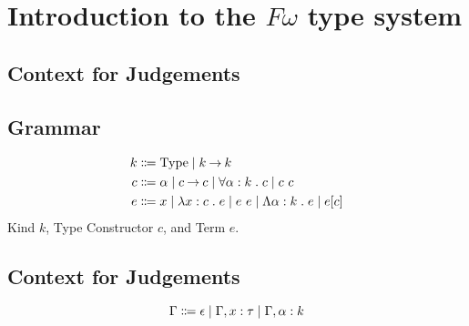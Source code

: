 \newpage
\section{Introduction to the $F\omega$ type system}


\begin{grouped}{\subsection{Context for Judgements}}
\subsection{Grammar}
\begin{align*}
k & \mathrel{\Coloneqq} \operatorname{Type} \mathrel{\mid} k \mathbin{\rightarrow} k \\
c & \mathrel{\Coloneqq} \alpha \mathrel{\mid} c \mathbin{\rightarrow} c \mathrel{\mid} \forall \alpha \mathrel{:} k\mathrel{.} c \mathrel{\mid} c\ c \\
e & \mathrel{\Coloneqq} x \mathrel{\mid} \lambda x \mathrel{:} c\mathrel{.} e \mathrel{\mid} e\ e
    \mathrel{\mid} \Lambda \alpha \mathrel{:} k\mathrel{.} e \mathrel{\mid} e [ c ] \\
\end{align*}
Kind $k$, Type Constructor $c$, and Term $e$.\\
\end{grouped}

\begin{grouped}{\subsection{Context for Judgements}}
\begin{equation} \label{Context}
\Gamma \mathrel{\Coloneqq} \epsilon \mathrel{\mid} \Gamma, x \mathrel{:} \tau \mathrel{\mid} \Gamma, \alpha \mathrel{:} k
\end{equation}
\end{grouped}

